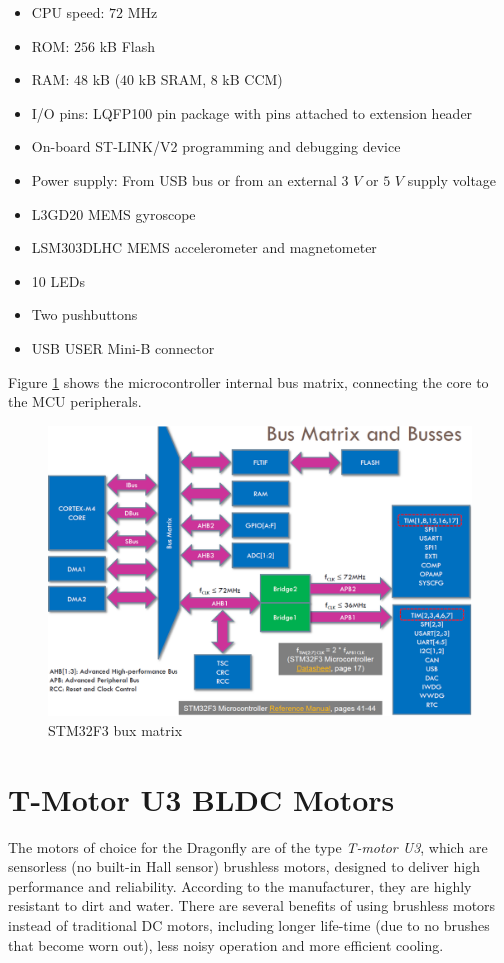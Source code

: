 \documentclass[a4paper]{report}
\begin{document}
\begin{itemize}
  \item CPU speed: $72$ MHz
  \item ROM: $256$ kB Flash
  \item RAM: $48$ kB ($40$ kB SRAM, $8$ kB CCM)
  \item I/O pins: LQFP100 pin package with pins attached to extension header
  \item On-board ST-LINK/V2 programming and debugging device
  \item Power supply: From USB bus or from an external $3$ $V$ or $5$ $V$ supply voltage
  \item L3GD20 MEMS gyroscope
  \item LSM303DLHC MEMS accelerometer and magnetometer
  \item 10 LEDs
  \item Two pushbuttons
  \item USB USER Mini-B connector
\end{itemize}

Figure \ref{fig:stm32f3busmatrix} shows the microcontroller internal bus matrix, connecting the core to the MCU peripherals.

\begin{figure}[h]
    \centering
    \includegraphics[scale=0.4]{images/stm32_busmatrix.png}
    \caption{STM32F3 bux matrix}
    \label{fig:stm32f3busmatrix}
\end{figure}

	\section{T-Motor U3 BLDC Motors}
The motors of choice for the Dragonfly are of the type \emph{T-motor U3}, which are sensorless (no built-in Hall sensor) brushless motors, designed to deliver high performance and reliability. According to the manufacturer, they are highly resistant to dirt and water. There are several benefits of using brushless motors instead of traditional DC motors, including longer life-time (due to no brushes that become worn out), less noisy operation and more efficient cooling.
\end{document}
